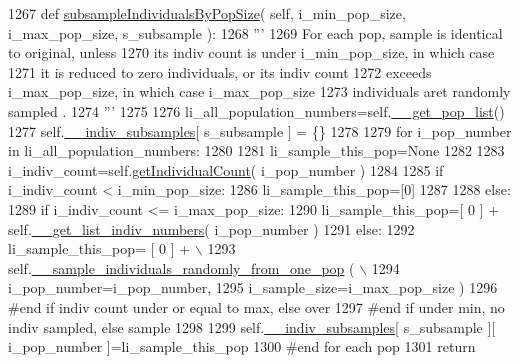 \begin{DoxyCode}
1267     \textcolor{keyword}{def }\hyperlink{classnegui_1_1genepopfilemanager_1_1GenepopFileManager_afdad8528d7b19a8b2eeca447bb95a5a0}{subsampleIndividualsByPopSize}( self, i\_min\_pop\_size, i\_max\_pop\_size, 
      s\_subsample ):
1268         \textcolor{stringliteral}{'''}
1269 \textcolor{stringliteral}{        For each pop, sample is identical to original, unless }
1270 \textcolor{stringliteral}{        its indiv count is under i\_min\_pop\_size, in which case}
1271 \textcolor{stringliteral}{        it is reduced to zero individuals, or its indiv count}
1272 \textcolor{stringliteral}{        exceeds i\_max\_pop\_size, in which case i\_max\_pop\_size }
1273 \textcolor{stringliteral}{        individuals aret randomly sampled .}
1274 \textcolor{stringliteral}{        '''}
1275 
1276         li\_all\_population\_numbers=self.\hyperlink{classnegui_1_1genepopfilemanager_1_1GenepopFileManager_a0cd3178624c652968b4d319f12e5df6e}{\_\_get\_pop\_list}()
1277         self.\hyperlink{classnegui_1_1genepopfilemanager_1_1GenepopFileManager_a1e8379bcee4902ca9314ff53fcb71644}{\_\_indiv\_subsamples}[ s\_subsample ] = \{\}
1278 
1279         \textcolor{keywordflow}{for} i\_pop\_number \textcolor{keywordflow}{in} li\_all\_population\_numbers:
1280 
1281             li\_sample\_this\_pop=\textcolor{keywordtype}{None}
1282 
1283             i\_indiv\_count=self.\hyperlink{classnegui_1_1genepopfilemanager_1_1GenepopFileManager_a05e723069f5129b21a4d017c2a5317b0}{getIndividualCount}( i\_pop\_number )
1284 
1285             \textcolor{keywordflow}{if} i\_indiv\_count < i\_min\_pop\_size:
1286                 li\_sample\_this\_pop=[0]
1287 
1288             \textcolor{keywordflow}{else}:               
1289                 \textcolor{keywordflow}{if} i\_indiv\_count <= i\_max\_pop\_size:
1290                     li\_sample\_this\_pop=[ 0 ] + self.\hyperlink{classnegui_1_1genepopfilemanager_1_1GenepopFileManager_a4615769e9db90aa477aa3fd865408f54}{\_\_get\_list\_indiv\_numbers}( 
      i\_pop\_number )
1291                 \textcolor{keywordflow}{else}:
1292                     li\_sample\_this\_pop= [ 0 ] + \(\backslash\)
1293                             self.\hyperlink{classnegui_1_1genepopfilemanager_1_1GenepopFileManager_a9818467c9cb40f8e1de0c6cc7f52e263}{\_\_sample\_individuals\_randomly\_from\_one\_pop}
      ( \(\backslash\)
1294                                                                  i\_pop\_number=i\_pop\_number,
1295                                                                  i\_sample\_size=i\_max\_pop\_size )
1296                 \textcolor{comment}{#end if indiv count under or equal to max, else over}
1297             \textcolor{comment}{#end if under min, no indiv sampled, else sample}
1298 
1299             self.\hyperlink{classnegui_1_1genepopfilemanager_1_1GenepopFileManager_a1e8379bcee4902ca9314ff53fcb71644}{\_\_indiv\_subsamples}[ s\_subsample ][ i\_pop\_number ]=li\_sample\_this\_pop
1300         \textcolor{comment}{#end for each pop}
1301         \textcolor{keywordflow}{return}
\end{DoxyCode}
